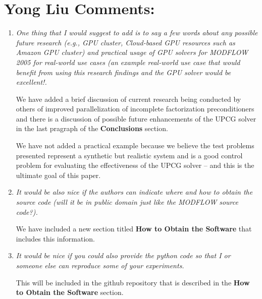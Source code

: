 \documentclass[12pt]{article} %
\begin{document}
\section*{\small{Yong Liu Comments:}}
\begin{enumerate}
\item \textit{One thing that I would suggest to add is to say a few words about any possible future research (e.g., GPU cluster, Cloud-based GPU resources such as Amazon GPU cluster) and practical usage of GPU solvers for MODFLOW 2005 for real-world use cases (an example real-world use case that would benefit from using this research findings and the GPU solver would be excellent!.}

We have added a brief discussion of current research being conducted by others of improved parallelization of incomplete factorization preconditioners and there is a discussion of possible future enhancements of the UPCG solver in the last pragraph of the \textbf{Conclusions} section.

We have not added a practical example because we believe the test problems presented represent a synthetic but realistic system and is a good control problem for evaluating the effectiveness of the UPCG solver -- and this is the ultimate goal of this paper.

\item \textit{It would be also nice if the authors can indicate where and how to obtain the source code (will it be in public domain just like the MODFLOW source code?).}

We have included a new section titled \textbf{How to Obtain the Software} that includes this information.

\item \textit{It would be nice if you could also provide the python code so that I or someone else can reproduce some of your experiments.}

This will be included in the github repository that is described in the \textbf{How to Obtain the Software} section.

\end{enumerate}
\end{document}
